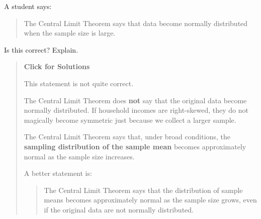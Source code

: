 \documentclass[
  letterpaper,
  DIV=11,
  numbers=noendperiod]{scrreprt}
\begin{document}
\begin{tcolorbox}[enhanced jigsaw, arc=.35mm, bottomrule=.15mm, bottomtitle=1mm, breakable, colback=white, colbacktitle=quarto-callout-note-color!10!white, colframe=quarto-callout-note-color-frame, coltitle=black, left=2mm, leftrule=.75mm, opacityback=0, opacitybacktitle=0.6, rightrule=.15mm, title=\textcolor{quarto-callout-note-color}{\faInfo}\hspace{0.5em}{Question 9}, titlerule=0mm, toprule=.15mm, toptitle=1mm]

A student says:

\begin{quote}
The Central Limit Theorem says that data become normally distributed
when the sample size is large.
\end{quote}

Is this correct? Explain.

\begin{quote}
\textbf{Click for Solutions}

This statement is not quite correct.

The Central Limit Theorem does \textbf{not} say that the original data
become normally distributed. If household incomes are right-skewed, they
do not magically become symmetric just because we collect a larger
sample.

The Central Limit Theorem says that, under broad conditions, the
\textbf{sampling distribution of the sample mean} becomes approximately
normal as the sample size increases.

A better statement is:

\begin{quote}
The Central Limit Theorem says that the distribution of sample means
becomes approximately normal as the sample size grows, even if the
original data are not normally distributed.
\end{quote}
\end{quote}

\end{tcolorbox}
\end{document}
